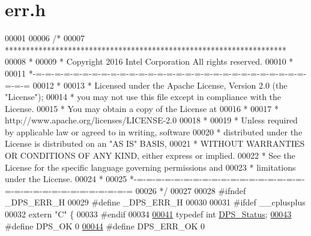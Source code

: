 \hypertarget{err_8h_source}{}\section{err.\+h}
\label{err_8h_source}

\begin{DoxyCode}
00001 
00006 \textcolor{comment}{/*}
00007 \textcolor{comment}{ *******************************************************************}
00008 \textcolor{comment}{ *}
00009 \textcolor{comment}{ * Copyright 2016 Intel Corporation All rights reserved.}
00010 \textcolor{comment}{ *}
00011 \textcolor{comment}{ *-=-=-=-=-=-=-=-=-=-=-=-=-=-=-=-=-=-=-=-=-=-=-=-=-=-=-=-=-=-=-=-=}
00012 \textcolor{comment}{ *}
00013 \textcolor{comment}{ * Licensed under the Apache License, Version 2.0 (the "License");}
00014 \textcolor{comment}{ * you may not use this file except in compliance with the License.}
00015 \textcolor{comment}{ * You may obtain a copy of the License at}
00016 \textcolor{comment}{ *}
00017 \textcolor{comment}{ *      http://www.apache.org/licenses/LICENSE-2.0}
00018 \textcolor{comment}{ *}
00019 \textcolor{comment}{ * Unless required by applicable law or agreed to in writing, software}
00020 \textcolor{comment}{ * distributed under the License is distributed on an "AS IS" BASIS,}
00021 \textcolor{comment}{ * WITHOUT WARRANTIES OR CONDITIONS OF ANY KIND, either express or implied.}
00022 \textcolor{comment}{ * See the License for the specific language governing permissions and}
00023 \textcolor{comment}{ * limitations under the License.}
00024 \textcolor{comment}{ *}
00025 \textcolor{comment}{ *-=-=-=-=-=-=-=-=-=-=-=-=-=-=-=-=-=-=-=-=-=-=-=-=-=-=-=-=-=-=-=-=}
00026 \textcolor{comment}{ */}
00027 
00028 \textcolor{preprocessor}{#ifndef \_DPS\_ERR\_H}
00029 \textcolor{preprocessor}{#define \_DPS\_ERR\_H}
00030 
00031 \textcolor{preprocessor}{#ifdef \_\_cplusplus}
00032 \textcolor{keyword}{extern} \textcolor{stringliteral}{"C"} \{
00033 \textcolor{preprocessor}{#endif}
00034 
\hyperlink{group__status_ga30395a84d3cad9d4ec29848106415038}{00041} \textcolor{keyword}{typedef} \textcolor{keywordtype}{int} \hyperlink{group__status_ga30395a84d3cad9d4ec29848106415038}{DPS\_Status}; 
\hyperlink{group__status_ga0ea3dd37bc558859ae0cb5a4f79a4bdd}{00043} \textcolor{preprocessor}{#define DPS\_OK                     0 }
\hyperlink{group__status_ga9127c1d49f4ca6a51c5585efc76ce362}{00044} \textcolor{preprocessor}{#define DPS\_ERR\_OK                 0 }

\end{DoxyCode}

